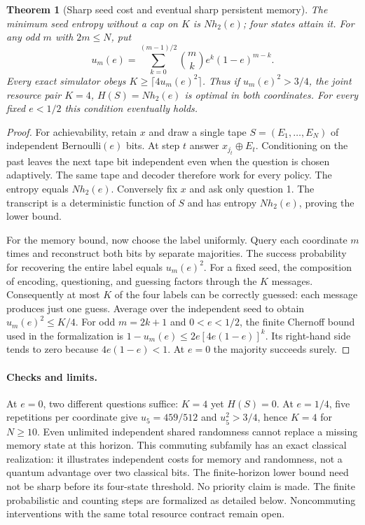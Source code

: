 \documentclass[11pt,a4paper]{article}
\newtheorem{theorem}{Theorem}[section]
\theoremstyle{definition}
\begin{document}
\begin{theorem}[Sharp seed cost and eventual sharp persistent memory]
The minimum seed entropy without a cap on $K$ is $Nh_2(e)$; four states attain it. For any odd $m$ with $2m\le N$, put
\[
 u_m(e)=\sum_{k=0}^{(m-1)/2}{m\choose k}e^k(1-e)^{m-k}.
\]
Every exact simulator obeys $K\ge\lceil4u_m(e)^2\rceil$. Thus if $u_m(e)^2>3/4$, the joint resource pair $K=4$, $H(S)=Nh_2(e)$ is optimal in both coordinates. For every fixed $e<1/2$ this condition eventually holds.
\end{theorem}
\begin{proof}
For achievability, retain $x$ and draw a single tape $S=(E_1,\ldots,E_N)$ of independent Bernoulli$(e)$ bits. At step $t$ answer $x_{j_t}\mathbin{\oplus}E_t$. Conditioning on the past leaves the next tape bit independent even when the question is chosen adaptively. The same tape and decoder therefore work for every policy. The entropy equals $Nh_2(e)$. Conversely fix $x$ and ask only question 1. The transcript is a deterministic function of $S$ and has entropy $Nh_2(e)$, proving the lower bound.

For the memory bound, now choose the label uniformly. Query each coordinate $m$ times and reconstruct both bits by separate majorities. The success probability for recovering the entire label equals $u_m(e)^2$. For a fixed seed, the composition of encoding, questioning, and guessing factors through the $K$ messages. Consequently at most $K$ of the four labels can be correctly guessed: each message produces just one guess. Average over the independent seed to obtain $u_m(e)^2\le K/4$. For odd $m=2k+1$ and $0<e<1/2$, the finite Chernoff bound used in the formalization is $1-u_m(e)\le 2e[4e(1-e)]^k$. Its right-hand side tends to zero because $4e(1-e)<1$. At $e=0$ the majority succeeds surely.
\end{proof}

\paragraph{Checks and limits.} At $e=0$, two different questions suffice: $K=4$ yet $H(S)=0$. At $e=1/4$, five repetitions per coordinate give $u_5=459/512$ and $u_5^2>3/4$, hence $K=4$ for $N\ge10$. Even unlimited independent shared randomness cannot replace a missing memory state at this horizon. This commuting subfamily has an exact classical realization: it illustrates independent costs for memory and randomness, not a quantum advantage over two classical bits. The finite-horizon lower bound need not be sharp before its four-state threshold. No priority claim is made. The finite probabilistic and counting steps are formalized as detailed below. Noncommuting interventions with the same total resource contract remain open.
\end{document}
